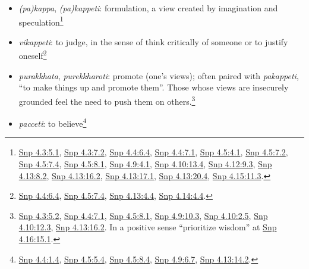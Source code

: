\documentclass[12pt,openany]{book}%
\begin{document}
\begin{itemize}
\item \textit{(pa)kappa}, \textit{(pa)kappeti}: formulation, a view created by imagination and speculation\footnote{\href{https://suttacentral.net/snp4.3/en/sujato\#5.1}{Snp 4.3:5.1}, \href{https://suttacentral.net/snp4.3/en/sujato\#7.2}{Snp 4.3:7.2}, \href{https://suttacentral.net/snp4.4/en/sujato\#6.4}{Snp 4.4:6.4}, \href{https://suttacentral.net/snp4.4/en/sujato\#7.1}{Snp 4.4:7.1}, \href{https://suttacentral.net/snp4.5/en/sujato\#4.1}{Snp 4.5:4.1}, \href{https://suttacentral.net/snp4.5/en/sujato\#7.2}{Snp 4.5:7.2}, \href{https://suttacentral.net/snp4.5/en/sujato\#7.4}{Snp 4.5:7.4}, \href{https://suttacentral.net/snp4.5/en/sujato\#8.1}{Snp 4.5:8.1}, \href{https://suttacentral.net/snp4.9/en/sujato\#4.1}{Snp 4.9:4.1}, \href{https://suttacentral.net/snp4.10/en/sujato\#13.4}{Snp 4.10:13.4}, \href{https://suttacentral.net/snp4.12/en/sujato\#9.3}{Snp 4.12:9.3}, \href{https://suttacentral.net/snp4.13/en/sujato\#8.2}{Snp 4.13:8.2}, \href{https://suttacentral.net/snp4.13/en/sujato\#16.2}{Snp 4.13:16.2}, \href{https://suttacentral.net/snp4.13/en/sujato\#17.1}{Snp 4.13:17.1}, \href{https://suttacentral.net/snp4.13/en/sujato\#20.4}{Snp 4.13:20.4}, \href{https://suttacentral.net/snp4.15/en/sujato\#11.3}{Snp 4.15:11.3}. }%
\item \textit{vikappeti}: to judge, in the sense of think critically of someone or to justify oneself\footnote{\href{https://suttacentral.net/snp4.4/en/sujato\#6.4}{Snp 4.4:6.4}, \href{https://suttacentral.net/snp4.5/en/sujato\#7.4}{Snp 4.5:7.4}, \href{https://suttacentral.net/snp4.13/en/sujato\#4.4}{Snp 4.13:4.4}, \href{https://suttacentral.net/snp4.14/en/sujato\#4.4}{Snp 4.14:4.4}. }%
\item \textit{purakkhata}, \textit{purekkharoti}: promote (one’s views); often paired with \textit{pakappeti}, “to make things up and promote them”. Those whose views are insecurely grounded feel the need to push them on others.\footnote{\href{https://suttacentral.net/snp4.3/en/sujato\#5.2}{Snp 4.3:5.2}, \href{https://suttacentral.net/snp4.4/en/sujato\#7.1}{Snp 4.4:7.1}, \href{https://suttacentral.net/snp4.5/en/sujato\#8.1}{Snp 4.5:8.1}, \href{https://suttacentral.net/snp4.9/en/sujato\#10.3}{Snp 4.9:10.3}, \href{https://suttacentral.net/snp4.10/en/sujato\#2.5}{Snp 4.10:2.5}, \href{https://suttacentral.net/snp4.10/en/sujato\#12.3}{Snp 4.10:12.3}, \href{https://suttacentral.net/snp4.13/en/sujato\#16.2}{Snp 4.13:16.2}. In a positive sense “prioritize wisdom” at \href{https://suttacentral.net/snp4.16/en/sujato\#15.1}{Snp 4.16:15.1}. }%
\item \textit{pacceti}: to believe\footnote{\href{https://suttacentral.net/snp4.4/en/sujato\#1.4}{Snp 4.4:1.4}, \href{https://suttacentral.net/snp4.5/en/sujato\#5.4}{Snp 4.5:5.4}, \href{https://suttacentral.net/snp4.5/en/sujato\#8.4}{Snp 4.5:8.4}, \href{https://suttacentral.net/snp4.9/en/sujato\#6.7}{Snp 4.9:6.7}, \href{https://suttacentral.net/snp4.13/en/sujato\#14.2}{Snp 4.13:14.2}. }%

\end{itemize}
\end{document}
